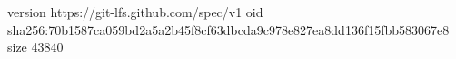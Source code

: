 version https://git-lfs.github.com/spec/v1
oid sha256:70b1587ca059bd2a5a2b45f8cf63dbcda9c978e827ea8dd136f15fbb583067e8
size 43840
